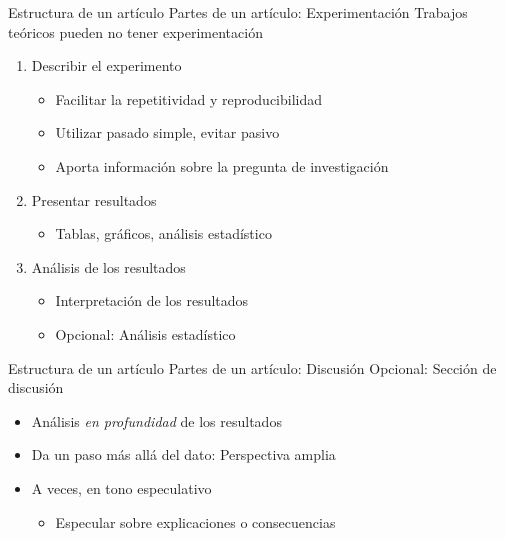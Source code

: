 \documentclass{beamer}
\begin{document}
\begin{frame}{Estructura de un artículo} {Partes de un artículo: Experimentación}
	\centering Trabajos teóricos pueden no tener experimentación
	\begin{enumerate}
	\item Describir el experimento
		\begin{itemize}
		\item Facilitar la \alert{repetitividad} y \alert{reproducibilidad}
		\item Utilizar pasado simple, evitar pasivo
		\item \alert{Aporta información sobre la pregunta de investigación}
		\end{itemize}
	\item Presentar resultados
		\begin{itemize}
		\item Tablas, gráficos, análisis estadístico
		\end{itemize}
	\item Análisis de los resultados
		\begin{itemize}
		\item Interpretación de los resultados
		\item Opcional: Análisis estadístico
		\end{itemize}
	\end{enumerate}
\end{frame}

\begin{frame}{Estructura de un artículo} {Partes de un artículo: Discusión}
	Opcional: Sección de discusión
		\begin{itemize}
		\item Análisis \textit{en profundidad} de los resultados
		\item Da un paso más allá del dato: Perspectiva amplia
		\item A veces, en tono especulativo
			\begin{itemize}
			\item Especular sobre explicaciones o consecuencias
			\end{itemize}
		\end{itemize}
\end{frame}
\end{document}
